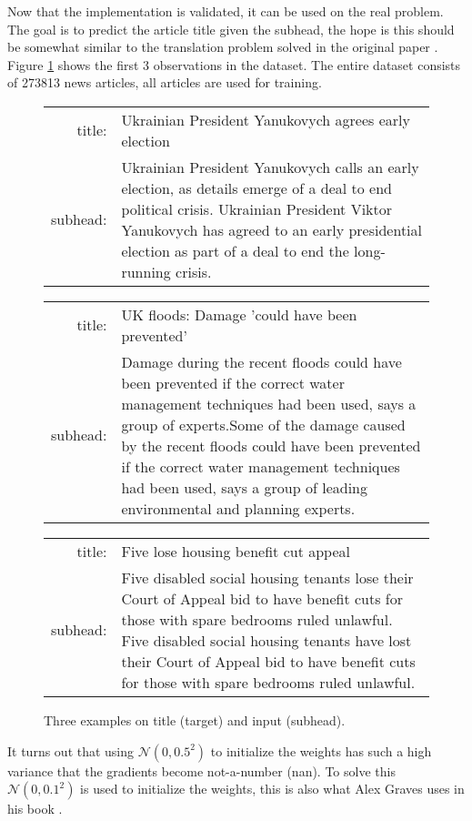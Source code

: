 Now that the implementation is validated, it can be used on the real problem. The goal is to predict the article title given the subhead, the hope is this should be somewhat similar to the translation problem solved in the original paper \cite{sutskever}. Figure \ref{fig:results:sutskever:example} shows the first 3 observations in the dataset. The entire dataset consists of 273813 news articles, all articles are used for training.

\begin{figure}[H]
\centering
\begin{tabular}{r|p{10cm}}
	title: & Ukrainian President Yanukovych agrees early election \\
	subhead: & Ukrainian President Yanukovych calls an early election, as details emerge of a deal to end political crisis. Ukrainian President Viktor Yanukovych has agreed to an early presidential election as part of a deal to end the long-running crisis.
\end{tabular}
\mbox{}\vspace*{0.5cm}
\begin{tabular}{r|p{10cm}}
	title: & UK floods: Damage 'could have been prevented' \\
	subhead: & Damage during the recent floods could have been prevented if the correct water management techniques had been used, says a group of experts.Some of the damage caused by the recent floods could have been prevented if the correct water management techniques had been used, says a group of leading environmental and planning experts.
\end{tabular}
\mbox{}\vspace*{0.5cm}
\begin{tabular}{r|p{10cm}}
	title: & Five lose housing benefit cut appeal \\
	subhead: & Five disabled social housing tenants lose their Court of Appeal bid to have benefit cuts for those with spare bedrooms ruled unlawful. Five disabled social housing tenants have lost their Court of Appeal bid to have benefit cuts for those with spare bedrooms ruled unlawful.
\end{tabular}
\caption{Three examples on title (target) and input (subhead).}
\label{fig:results:sutskever:example}
\end{figure}

It turns out that using $\mathcal{N}(0, 0.5^2)$ to initialize the weights has such a high variance that the gradients become not-a-number (nan). To solve this $\mathcal{N}(0, 0.1^2)$ is used to initialize the weights, this is also what Alex Graves uses in his book \cite{alexgraves}.

